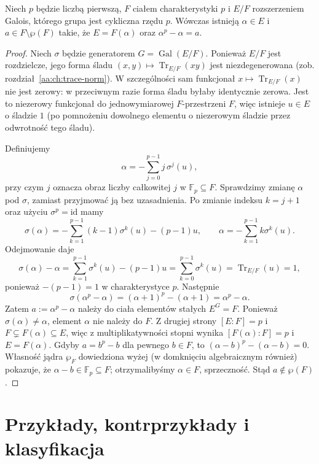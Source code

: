 \begin{twierdzenie}\label{aa:tw:as-converse}
Niech $p$ będzie liczbą pierwszą, $F$ ciałem charakterystyki $p$
i $E/F$ rozszerzeniem Galois, którego grupa jest cykliczna rzędu
$p$. Wówczas istnieją $\alpha\in E$ i $a\in F\setminus\wp(F)$
takie, że $E=F(\alpha)$ oraz $\alpha^p-\alpha=a$.
\end{twierdzenie}
\begin{proof}
Niech $\sigma$ będzie generatorem $G=\operatorname{Gal}(E/F)$.
Ponieważ $E/F$ jest rozdzielcze, jego forma śladu
$(x,y)\mapsto\operatorname{Tr}_{E/F}(xy)$ jest niezdegenerowana
(zob. rozdział~\ref{aa:ch:trace-norm}). W szczególności sam
funkcjonał $x\mapsto\operatorname{Tr}_{E/F}(x)$ nie jest
zerowy: w przeciwnym razie forma śladu byłaby identycznie
zerowa. Jest to niezerowy funkcjonał do jednowymiarowej
$F$-przestrzeni $F$, więc istnieje $u\in E$ o śladzie $1$
(po pomnożeniu dowolnego elementu o niezerowym śladzie przez
odwrotność tego śladu).

Definiujemy
\[
\alpha=-\sum_{j=0}^{p-1}j\,\sigma^j(u),
\]
przy czym $j$ oznacza obraz liczby całkowitej $j$ w
$\mathbb F_p\subseteq F$. Sprawdzimy zmianę $\alpha$ pod
$\sigma$, zamiast przyjmować ją bez uzasadnienia. Po zmianie
indeksu $k=j+1$ oraz użyciu $\sigma^p=\mathrm{id}$ mamy
\[
\sigma(\alpha)=-\sum_{k=1}^{p-1}(k-1)\sigma^k(u)
-(p-1)u,
\qquad
\alpha=-\sum_{k=1}^{p-1}k\sigma^k(u).
\]
Odejmowanie daje
\[
\sigma(\alpha)-\alpha
=\sum_{k=1}^{p-1}\sigma^k(u)-(p-1)u
=\sum_{k=0}^{p-1}\sigma^k(u)
=\operatorname{Tr}_{E/F}(u)=1,
\]
ponieważ $-(p-1)=1$ w charakterystyce $p$.
Następnie
\[
\sigma(\alpha^p-\alpha)
=(\alpha+1)^p-(\alpha+1)=\alpha^p-\alpha.
\]
Zatem $a:=\alpha^p-\alpha$ należy do ciała elementów
stałych $E^G=F$. Ponieważ $\sigma(\alpha)\ne\alpha$,
element $\alpha$ nie należy do $F$. Z drugiej strony
$[E:F]=p$ i $F\subsetneq F(\alpha)\subseteq E$, więc z
multiplikatywności stopni wynika $[F(\alpha):F]=p$ i
$E=F(\alpha)$. Gdyby $a=b^p-b$ dla pewnego $b\in F$,
to $(\alpha-b)^p-(\alpha-b)=0$. Własność jądra $\wp_F$
dowiedziona wyżej (w domknięciu algebraicznym również)
pokazuje, że $\alpha-b\in\mathbb F_p\subseteq F$; otrzymalibyśmy
$\alpha\in F$, sprzeczność. Stąd $a\notin\wp(F)$.
\end{proof}

\section{Przykłady, kontrprzykłady i klasyfikacja}

